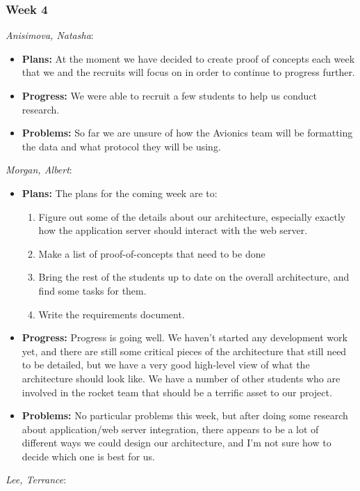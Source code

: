 \documentclass[10pt,draftclsnofoot,onecolumn]{IEEEtran}
\newcommand{\subsubsubsection}[1]{
	\hfill\break\textit{#1}:
}
\begin{document}
\subsubsection{Week 4}
\subsubsubsection{Anisimova, Natasha}
\begin{itemize}
	\item \textbf{Plans: }
	At the moment we have decided to create proof of concepts each week that we and the recruits will
	focus on in order to continue to progress further.
	\item \textbf{Progress: }
	We were able to recruit a few students to help us conduct research.
	\item \textbf{Problems: }
	So far we are unsure of how the Avionics team will be formatting the data and what protocol they
	will be using.
\end{itemize}
\subsubsubsection{Morgan, Albert}
\begin{itemize}
	\item \textbf{Plans: }
	The plans for the coming week are to:

	\begin{enumerate}
		\item	Figure out some of the details about our architecture, especially exactly how the application server should interact with the web server.
		\item Make a list of proof-of-concepts that need to be done
		\item Bring the rest of the students up to date on the overall architecture, and find some tasks for them.
		\item Write the requirements document.
	\end{enumerate}
	\item \textbf{Progress: }
	Progress is going well. We haven't started any development work yet, and there are still some critical pieces of the architecture that still need to be detailed, but we have a very good high-level view of what the architecture should look like. We have a number of other students who are involved in the rocket team that should be a terrific asset to our project.
	\item \textbf{Problems: }
	No particular problems this week, but after doing some research about application/web server integration, there appears to be a lot of different ways we could design our architecture, and I'm not sure how to decide which one is best for us.
\end{itemize}
\subsubsubsection{Lee, Terrance}
\end{document}

